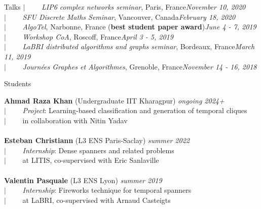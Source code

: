 \documentclass[french]{resume} %
\begin{document}
\begin{rSection}{Talks}
		$| \qquad$ \textit{LIP6 complex networks seminar}, Paris, France\hfill {\em November 10, 2020} \\
		$| \qquad$ \textit{SFU Discrete Maths Seminar}, Vancouver, Canada\hfill {\em February 18, 2020} \\
		$| \qquad$ \textit{AlgoTel}, Narbonne, France (\textbf{best student paper award})\hfill {\em June 4 - 7, 2019} \\
		$| \qquad$ \textit{Workshop CoA}, Roscoff, France\hfill {\em April 3 - 5, 2019} \\
		$| \qquad$ \textit{LaBRI distributed algorithms and graphs seminar}, Bordeaux, France\hfill {\em March 11, 2019} \\
		$| \qquad$ \textit{Journées Graphes et Algorithmes}, Grenoble, France\hfill {\em November 14 - 16, 2018}
	\end{rSection}
	
	\newpage
	
	\begin{rSection}{Students}
		
		{\bf Ahmad Raza Khan} (Undergraduate IIT Kharagpur) \hfill {\em ongoing 2024+}
		\\
		$| \qquad$ \textit{Project}: Learning-based classification and generation of temporal cliques\\
		$| \qquad$ in collaboration with Nitin Yadav
		\\ \\	{\bf Esteban Christiann} (L3 ENS Paris-Saclay) \hfill {\em summer 2022}
		\\
		$| \qquad$ \textit{Internship}: Dense spanners and related problems\\
		$| \qquad$ at LITIS, co-supervised with Eric Sanlaville
		\\ \\	
		{\bf Valentin Pasquale} (L3 ENS Lyon) \hfill {\em summer 2019} 
		\\
		$| \qquad$ \textit{Internship}: Fireworks technique for temporal spanners\\
		$| \qquad$ at LaBRI, co-supervised with Arnaud Casteigts
	\end{rSection}
	
\end{document}
